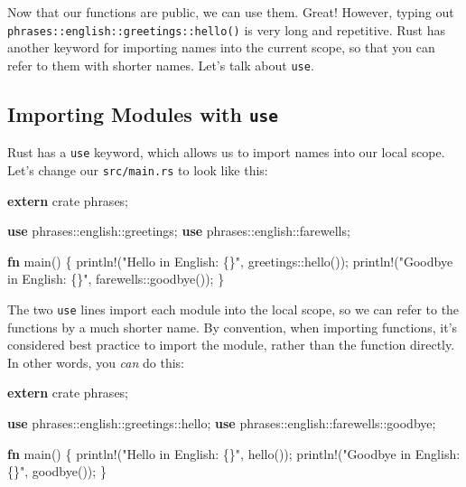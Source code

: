 \documentclass[a4paper,]{book}
\newenvironment{Shaded}{\begin{snugshade}}{\end{snugshade}}
\newcommand{\KeywordTok}[1]{\textcolor[rgb]{0.13,0.29,0.53}{\textbf{{#1}}}}
\newcommand{\StringTok}[1]{\textcolor[rgb]{0.31,0.60,0.02}{{#1}}}
\newcommand{\OtherTok}[1]{\textcolor[rgb]{0.56,0.35,0.01}{{#1}}}
\newcommand{\NormalTok}[1]{{#1}}
\begin{document}
Now that our functions are public, we can use them. Great! However,
typing out \texttt{phrases::english::greetings::hello()} is very long
and repetitive. Rust has another keyword for importing names into the
current scope, so that you can refer to them with shorter names. Let's
talk about \texttt{use}.

\subsection{\texorpdfstring{Importing Modules with
\texttt{use}}{Importing Modules with use}}\label{importing-modules-with-use}

Rust has a \texttt{use} keyword, which allows us to import names into
our local scope. Let's change our \texttt{src/main.rs} to look like
this:

\begin{Shaded}
\begin{Highlighting}[]
\KeywordTok{extern} \NormalTok{crate phrases;}

\KeywordTok{use} \NormalTok{phrases::english::greetings;}
\KeywordTok{use} \NormalTok{phrases::english::farewells;}

\KeywordTok{fn} \NormalTok{main() \{}
    \OtherTok{println!}\NormalTok{(}\StringTok{"Hello in English: \{\}"}\NormalTok{, greetings::hello());}
    \OtherTok{println!}\NormalTok{(}\StringTok{"Goodbye in English: \{\}"}\NormalTok{, farewells::goodbye());}
\NormalTok{\}}
\end{Highlighting}
\end{Shaded}

The two \texttt{use} lines import each module into the local scope, so
we can refer to the functions by a much shorter name. By convention,
when importing functions, it's considered best practice to import the
module, rather than the function directly. In other words, you
\emph{can} do this:

\begin{Shaded}
\begin{Highlighting}[]
\KeywordTok{extern} \NormalTok{crate phrases;}

\KeywordTok{use} \NormalTok{phrases::english::greetings::hello;}
\KeywordTok{use} \NormalTok{phrases::english::farewells::goodbye;}

\KeywordTok{fn} \NormalTok{main() \{}
    \OtherTok{println!}\NormalTok{(}\StringTok{"Hello in English: \{\}"}\NormalTok{, hello());}
    \OtherTok{println!}\NormalTok{(}\StringTok{"Goodbye in English: \{\}"}\NormalTok{, goodbye());}
\NormalTok{\}}
\end{Highlighting}
\end{Shaded}
\end{document}
